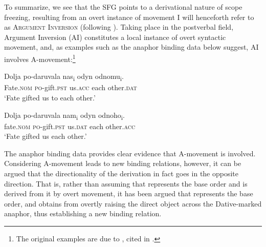 \documentclass[output=paper,colorlinks,citecolor=brown]{langscibook}
\begin{document}
To summarize, we see that the SFG points to a derivational nature of scope freezing, resulting from an overt instance of movement I will henceforth refer to as \textsc{Argument Inversion} (following \citealt{AntonyukMykhaylyk2022}). Taking place in the postverbal field, Argument Inversion (AI) constitutes a local instance of overt syntactic movement, and, as examples such as the anaphor binding data below suggest, AI involves A-movement:\footnote{\textrm{The original examples are due to \citet{Asarina2005}, cited in \citet{Bailyn2012}.}}

\ea%
    \label{ex:antonyuk:17}

\ea \label{ex:antonyuk:17a}
\gll   Dolja     po-daruvala     nas\textsubscript{i}    odyn odnomu\textsubscript{i}.     \\
Fate.\textsc{nom}   \textsc{po}-gift.\textsc{pst}    us.\textsc{acc}     each other.\textsc{dat}\\
\glt ‘Fate gifted us to each other.’

 \ex \label{ex:antonyuk:17b}
\gll   Dolja     po-daruvala     nam\textsubscript{i}    odyn odnoho\textsubscript{i}.\\
  fate.\textsc{nom}  \textsc{po}-gift.\textsc{pst}    us.\textsc{dat}    each other.\textsc{acc}\\
\glt `Fate gifted us each other.’
    \z
\z

\noindent The anaphor binding data provides clear evidence that A-movement is involved. Considering A-movement leads to new binding relations, however, it can be argued that the directionality of the derivation in fact goes in the opposite direction. That is, rather than assuming that  represents the base order and  is derived from it by overt movement, it has been argued that  represents the base order, and  obtains from overtly raising the direct object across the Dative-marked anaphor, thus establishing a new binding relation. 
\end{document}
